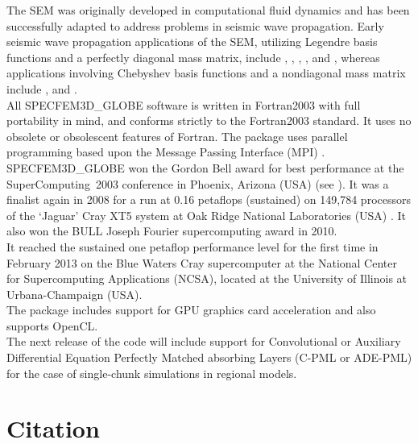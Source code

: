 \documentclass[oneside,english]{book}
\begin{document}
The SEM was originally developed in computational fluid dynamics \citep{Pat84,MaPa89}
and has been successfully adapted to address problems in seismic wave propagation.
Early seismic wave propagation applications of the SEM, utilizing Legendre basis functions and a
perfectly diagonal mass matrix, include \cite{CoJoTo93}, \cite{Kom97},
\cite{FaMaPaQu97}, \cite{CaGa97}, \cite{KoVi98} and \cite{KoTr99},
whereas applications involving Chebyshev basis functions and a nondiagonal mass matrix
include \cite{SePr94}, \cite{PrCaSe94} and \cite{SePrPr95}.\\

All SPECFEM3D\_GLOBE software is written in Fortran2003 with full portability
in mind, and conforms strictly to the Fortran2003 standard. It uses
no obsolete or obsolescent features of Fortran. The package uses
parallel programming based upon the Message Passing Interface (MPI)
\citep{GrLuSk94,Pac97}.\\

SPECFEM3D\_GLOBE won the Gordon Bell award for best performance at the SuperComputing~2003
conference in Phoenix, Arizona (USA) (see \cite{KoTsChTr03}).
It was a finalist again in 2008 for a run at 0.16 petaflops (sustained) on 149,784 processors of the `Jaguar' Cray XT5 system at Oak Ridge National Laboratories (USA) \citep{CaKoLaTiMiLeSnTr08}.
It also won the BULL Joseph Fourier supercomputing award in 2010.\\

It reached the sustained one petaflop performance level for the first time in February 2013
on the Blue Waters Cray supercomputer at the National Center for Supercomputing Applications (NCSA), located at the University of Illinois at Urbana-Champaign (USA).\\

The package includes support for GPU graphics card acceleration \citep{Kom11,MiKo10,KoMiEr09,KoErGoMi10} and also supports OpenCL.\\

The next release of the code will include support for
Convolutional or Auxiliary Differential Equation Perfectly Matched absorbing Layers (C-PML or ADE-PML)
\citep{MaKoEz08,MaKoGe08,MaKo09,MaKoGeBr10,KoMa07} for the case of single-chunk simulations in regional models.

\section{Citation}
\end{document}
